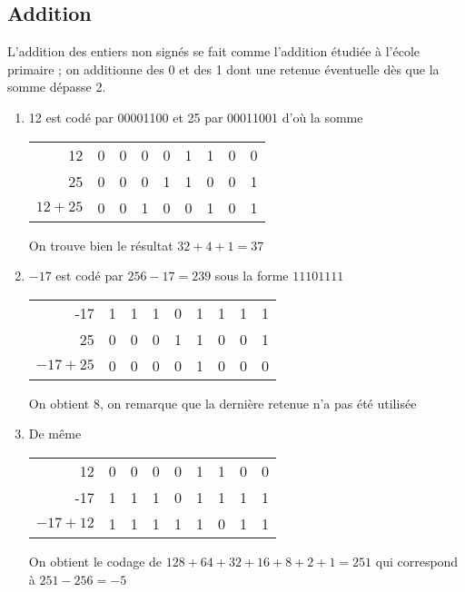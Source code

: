 \subsection{Addition}
L'addition des entiers non signés se fait comme l'addition étudiée à l'école primaire ; on additionne des 0 et des 1 dont une retenue éventuelle dès que la somme dépasse 2.
\begin{enumerate}
\item 12 est codé par 00001100 et 25 par 00011001 d'où la somme
\begin{center}
\begin{tabular}{r|cccccccc}
12      &0&0&0&0&1&1&0&0\\
25      &0&0&0&1&1&0&0&1\\
$12+25$ &0&0&1&0&0&1&0&1\\
\end{tabular}
\end{center}
On trouve bien le résultat $32 + 4 + 1 =37$
\item $-17$ est codé par $256-17=239$ sous la forme $11101111$ 
\begin{center}
\begin{tabular}{r|cccccccc}
-17      &1&1&1&0&1&1&1&1\\
25       &0&0&0&1&1&0&0&1\\
$-17+25$ &0&0&0&0&1&0&0&0\\
\end{tabular}
\end{center}
On obtient 8, on remarque que la dernière retenue n'a pas été utilisée
\item De même
\begin{center}
\begin{tabular}{r|cccccccc}
12       &0&0&0&0&1&1&0&0\\
-17      &1&1&1&0&1&1&1&1\\
$-17+12$ &1&1&1&1&1&0&1&1\\
\end{tabular}
\end{center}
On obtient le codage de $128 + 64 + 32 + 16 + 8 + 2 + 1= 251$ qui correspond à $251-256=-5$
\end{enumerate}
